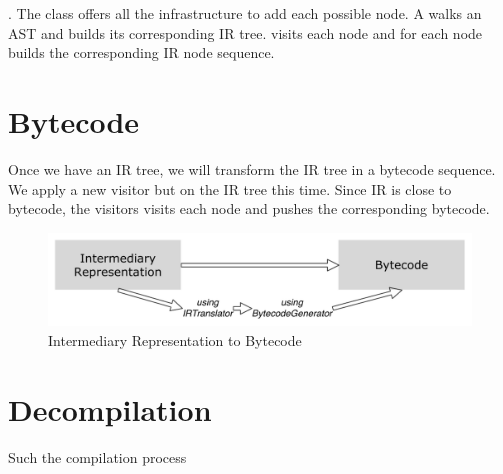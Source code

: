 \documentclass[a4paper,10pt,twoside]{book}
\begin{document}
 . The class   offers all the infrastructure to add each possible node. A  walks an AST and builds its corresponding IR tree.   visits each node and for each node  builds the corresponding IR node sequence. 


\section{Bytecode}
Once we have an IR tree, we will transform the IR tree in a bytecode sequence. We apply a new visitor but on the IR tree this time. Since IR is close to bytecode, the visitors visits each node and pushes the corresponding bytecode.

\begin{figure}[ht]\centering
	\includegraphics[width=\linewidth]{IRToBytecode}
	\caption{Intermediary Representation to Bytecode }
\end{figure}


\section{Decompilation}
Such the compilation process

\ifx\wholebook\relax\else
   
   
\end{document}
